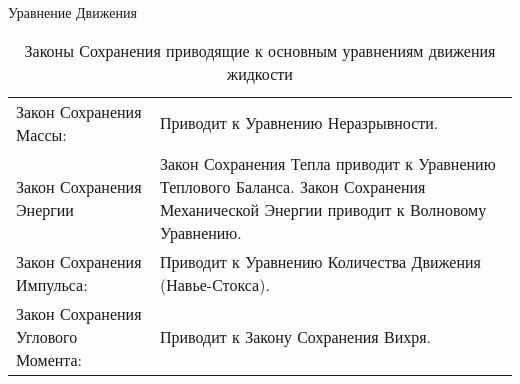 \begin{chapter}{Уравнение Движения}
\begin{table}
\caption{Законы Сохранения приводящие к основным уравнениям движения жидкости}
\begin{tabular}{ll}
Закон Сохранения Массы:
 & Приводит к Уравнению Неразрывности.\\
Закон Сохранения Энергии
 & Закон Сохранения Тепла приводит к Уравнению Теплового Баланса. 
   Закон Сохранения Механической Энергии приводит к Волновому Уравнению.\\
Закон Сохранения Импульса:
 & Приводит к Уравнению Количества Движения (Навье-Стокса).\\
Закон Сохранения Углового Момента:
& Приводит к Закону Сохранения Вихря.\\
\end{tabular}
\end{table}
%


\end{chapter}
